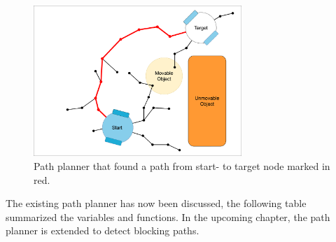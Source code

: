 \begin{figure}[H]
    \centering
    \includegraphics[width=0.7\textwidth, cfbox=my_grey 5pt 0pt]{figures/required_background/mp/7mp_path_found.drawio.png}
    \caption{Path planner that found a path from start- to target node marked in red.}
    \label{fig:motion_planner_adding_one_node_final}
\end{figure}

The existing path planner has now been discussed, the following table summarized the variables and functions. In the upcoming chapter, the path planner is extended to detect blocking paths.\bs


